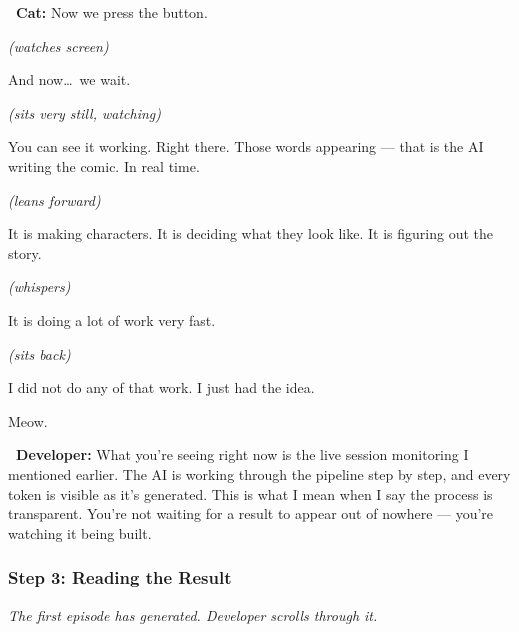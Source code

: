 \documentclass[12pt, letterpaper]{article}
\newcommand{\dev}{\textbf{\color{cogblue}\faIcon{laptop-code}\ Developer:}}
\newcommand{\cat}{\textbf{\color{catpink}\faIcon{cat}\ Cat:}}
\newcommand{\stage}[1]{%
    \begin{stagebox}%
      \textit{\color{black!60}#1}%
    \end{stagebox}%
  }
\begin{document}
  \begin{catbox}
    \cat{} \large Now we press the button.

    \medskip
    {\large\textit{(watches screen)}}

    \medskip
    {\large And now\ldots\ we wait.}

    \medskip
    {\large\textit{(sits very still, watching)}}

    \medskip
    {\large You can see it working. Right there. Those words appearing — that is
    the AI writing the comic. In real time.}

    \medskip
    {\large\textit{(leans forward)}}

    \medskip
    {\large It is making characters. It is deciding what they look like. It is
    figuring out the story.}

    \medskip
    {\large\textit{(whispers)}}

    \medskip
    {\large It is doing a lot of work very fast.}

    \medskip
    {\large\textit{(sits back)}}

    \medskip
    {\large I did not do any of that work. I just had the idea.}

    \medskip
    {\large Meow.}
  \end{catbox}

  \begin{developerbox}
    \dev{} What you're seeing right now is the live session monitoring I mentioned
    earlier. The AI is working through the pipeline step by step, and every token
    is visible as it's generated. This is what I mean when I say the process is
    transparent. You're not waiting for a result to appear out of nowhere — you're
    watching it being built.
  \end{developerbox}

  \subsubsection{Step 3: Reading the Result}

  \stage{The first episode has generated. Developer scrolls through it.}
\end{document}
